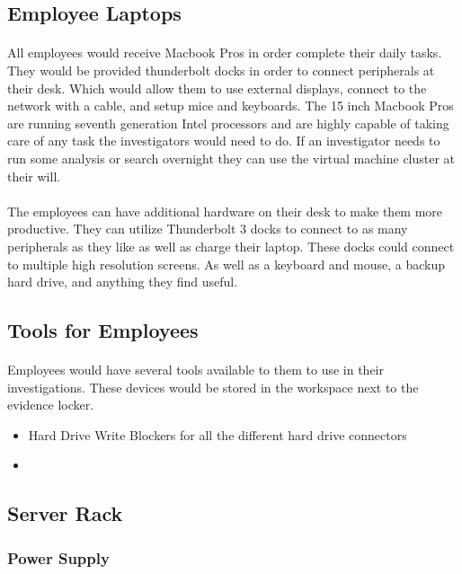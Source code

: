 \documentclass{article}
\begin{document}
\subsection{Employee Laptops} 
\paragraph{}
All employees would receive Macbook Pros in order complete their daily tasks.
They would be provided thunderbolt docks in order to connect peripherals at their desk.
Which would allow them to use external displays, connect to the network with a cable, and setup mice and keyboards.
The 15 inch Macbook Pros are running seventh generation Intel processors and are highly capable of taking care of any task the investigators would need to do. 
If an investigator needs to run some analysis or search overnight they can use the virtual machine cluster at their will.
\paragraph{}
The employees can have additional hardware on their desk to make them more productive.
They can utilize Thunderbolt 3 docks to connect to as many peripherals as they like as well as charge their laptop.
These docks could connect to multiple high resolution screens. As well as a keyboard and mouse, a backup hard drive, and anything they find useful.

 
\subsection{Tools for Employees} 
\paragraph{}
Employees would have several tools available to them to use in their investigations.
These devices would be stored in the workspace next to the evidence locker.
\begin{itemize}
\item Hard Drive Write Blockers for all the different hard drive connectors
\item 
\end{itemize} 

\subsection{Server Rack}
\subsubsection{Power Supply}
\end{document}
